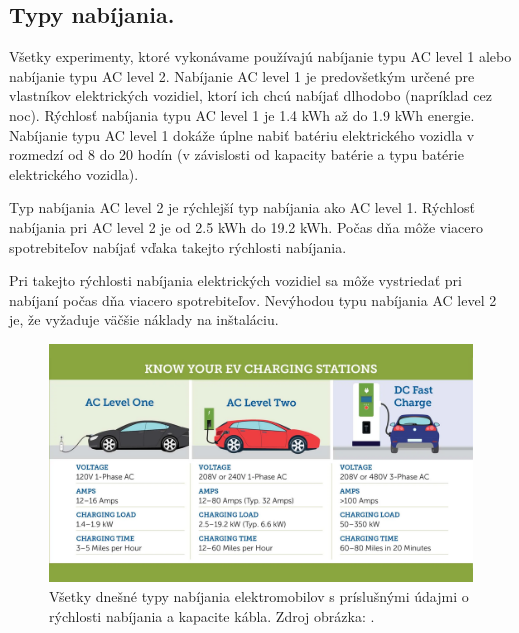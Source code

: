 \subsection{Typy nabíjania.}

Všetky experimenty, ktoré vykonávame používajú nabíjanie typu AC level 1 alebo nabíjanie typu AC level 2. Nabíjanie AC level 1 je predovšetkým určené pre vlastníkov elektrických vozidiel, ktorí ich chcú nabíjať dlhodobo (napríklad cez noc). 
Rýchlosť nabíjania typu AC level 1 je 1.4 kWh až do 1.9 kWh energie. Nabíjanie typu AC level 1 dokáže úplne nabiť batériu elektrického vozidla v rozmedzí od 8 do 20 hodín (v závislosti od kapacity batérie a typu batérie elektrického vozidla).


Typ nabíjania AC level 2 je rýchlejší typ nabíjania ako AC level 1. Rýchlosť nabíjania pri AC level 2 je od 2.5 kWh do 19.2 kWh. Počas dňa môže viacero spotrebiteľov nabíjať vďaka takejto rýchlosti nabíjania. 

Pri takejto rýchlosti nabíjania elektrických vozidiel sa môže vystriedať pri nabíjaní počas dňa viacero spotrebiteľov. Nevýhodou typu nabíjania AC level 2 je, že vyžaduje väčšie náklady na inštaláciu.
\cite{charginglevelsumini, websitecharginglevels2023}

\begin{figure}[H]
    \includegraphics[width=1\textwidth]{images/EVCharger-Levels-jpg.png}
    \centering
    \caption[Typy nabíjania elektromobilov]{Všetky dnešné typy nabíjania elektromobilov s príslušnými údajmi o rýchlosti nabíjania a kapacite kábla. Zdroj obrázka: \cite{websitecharginglevels2023}.}
    \label{typynabijania:obr}
    \end{figure}

